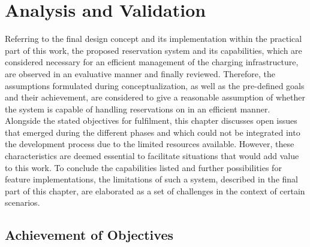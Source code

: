 
\chapter{Analysis and Validation}
\label{ch:Analysis and Validation}

Referring to the final design concept and its implementation within the practical part of this work, the proposed reservation system and its capabilities, which are considered necessary for an efficient management of the charging infrastructure, are observed in an evaluative manner and finally reviewed.
Therefore, the assumptions formulated during conceptualization, as well as the pre-defined goals and their achievement, are considered to give a reasonable assumption of whether the system is capable of handling reservations on  in an efficient manner.
Alongside the stated objectives for fulfilment, this chapter discusses open issues that emerged during the different phases and which could not be integrated into the development process due to the limited resources available. However, these characteristics are deemed essential to facilitate situations that would add value to this work.
To conclude the capabilities listed and further possibilities for feature implementations, the limitations of such a system, described in the final part of this chapter, are elaborated as a set of challenges in the context of certain scenarios. 

\section{Achievement of Objectives}
\label{ch:Analysis and Validation:sec:Achievement of Objectives}

